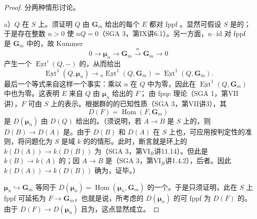 \begin{proof}
分两种情形讨论。

 a）$Q$ 在 $S$ 上。须证明 $Q$ 由 $\mathbf G_m$ 给出的每个 $E$ 都对 fppf 。显然可假设 $S$ 是的；于是存在整数 $n>0$ 使 $nQ=0$（SGA 3，第IX讲6.1）。另一方面，$n\cdot\mathrm{id}$ 对 fppf 是 $\mathbf G_m$ 中的，故 Kummer 
\[
0\longrightarrow\boldsymbol\mu_n\longrightarrow\mathbf G_m\xrightarrow{n}\mathbf G_m\longrightarrow0
\]
产生一个 $\underline{\operatorname{Ext}}^i(Q,-)$ 的，从而给出
\[
\underline{\operatorname{Ext}}^1(Q,\boldsymbol\mu_n)\longrightarrow{}_n\underline{\operatorname{Ext}}^1(Q,\mathbf G_m)=\underline{\operatorname{Ext}}^1(Q,\mathbf G_m).
\]
最后一个等式来自这样一个事实：乘以 $n$ 在 $Q$ 中为零，因此在 $\underline{\operatorname{Ext}}^1(Q,\mathbf G_m)$ 中也为零。这表明 $E$ 来自 $Q$ 由 $\boldsymbol\mu_n$ 给出的 $F$；
由 fpqc 理论（SGA 1，第VII讲），$F$ 可由 $S$ 上的表示。根据群的的已知性质（SGA 3，第VII讲3），其
\[D(F)=\underline{\operatorname{Hom}}(F,\mathbf G_m)\]
是 $D(\boldsymbol\mu_n)$ 由 $D(Q)$ 给出的。（须说明，若 $A\to B$ 是 $S$ 上的，则 $D(B)\to D(A)$ 是。由于 $D(B)$ 和 $D(A)$ 在 $S$ 上也，可应用按判定性的准则，将问题化为 $S$ 是域 $k$ 的的情形。此时，断言就是环上的 $k(D(A))\to k(D(B))$ 为（SGA 3，第VI$_B$讲11.14）。但此是 $k(B)\to k(A)$ 的；因 $A\to B$ 是（SGA 3，第VI$_B$讲1.4.2），后者。因此 $k(D(A))\to k(D(B))$ 确为，证毕。）

 $\boldsymbol\mu_n\hookrightarrow\mathbf G_m$ 等同于 $D(\boldsymbol\mu_n)=\underline{\operatorname{Hom}}(\boldsymbol\mu_n,\mathbf G_m)$ 的一个。于是只须证明，此在 $S$ 上 fppf 可延拓为 $F\to\mathbf G_m$，也就是说，所考虑的 $D(\boldsymbol\mu_n)$ 的可 fppf 为 $D(F)$ 的。由于 $D(F)\to D(\boldsymbol\mu_n)$ 且为，这点显然成立。


\end{proof}
